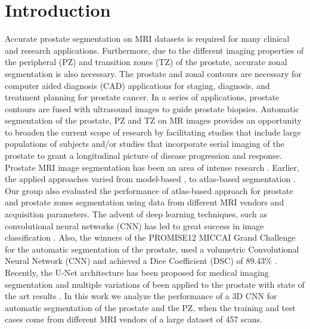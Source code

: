 \section{Introduction}
\label{sec:intro}
Accurate prostate segmentation on MRI datasets is required for many clinical and research applications. Furthermore, due to the different imaging properties of the peripheral (PZ) and transition zones (TZ) of the prostate, accurate zonal segmentation is also necessary.  The prostate and zonal contours are necessary for computer aided diagnosis (CAD) applications for staging, diagnosis, and treatment planning for prostate cancer. In a series of applications, prostate contours are fused with ultrasound images to guide prostate biopsies. Automatic segmentation of the prostate, PZ and TZ on MR images provides an opportunity to broaden the current scope of research by facilitating studies that include large populations of subjects and/or studies that incorporate serial imaging of the prostate to grant a longitudinal picture of disease progression and response.  Prostate MRI image segmentation has been an area of intense research \cite{litjens2014evaluation}. Earlier, the applied approaches varied from model-based \cite{chowdhury2012concurrent,toth2012multifeature}, to atlas-based segmentation \cite{4_klein2008automatic,5_cheng2014atlas,6_xie2014low,7_tian2015fully,8_korsager2015use,9_chilali2016gland}.  Our group also evaluated the performance of atlas-based approach for prostate and prostate zones segmentation using data from different MRI vendors and acquisition parameters\cite{10_padgett2018towards}. The advent of deep learning techniques, such as convolutional neural networks (CNN) has led to great success in image classification \cite{11_krizhevsky2012imagenet,12_simonyan2011immediate}.  Also, the winners of the PROMISE12 MICCAI Grand Challenge \cite{litjens2014evaluation} for the automatic segmentation of the prostate,  used a volumetric Convolutional Neural Network (CNN) and achieved a Dice Coefficient (DSC) of 89.43\% \cite{yu2017volumetric}.  Recently, the U-Net architecture has been proposed \cite{13_ronneberger2015u} for medical imaging segmentation and multiple variations of been applied to the prostate with state of the art results \cite{14_meyer2018automatic}.  In this work we analyze the performance of a 3D CNN for automatic segmentation of the prostate and the PZ, when the training and test cases come from different MRI vendors of a large dataset of 457 scans. 
